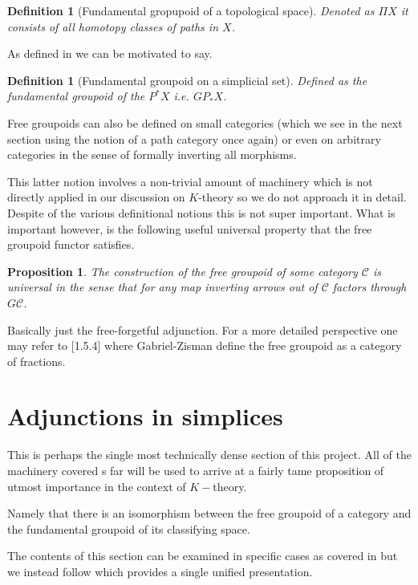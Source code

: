 \documentclass[12pt]{report}
\numberwithin{equation}{section}
\newtheorem{definition}[dummy]{Definition}
\newtheorem{proposition}[dummy]{Proposition}
\begin{document}
	\begin{definition}[Fundamental gropupoid of a topological space]
		Denoted as $\Pi X$ it consists of all homotopy classes of paths in $X$.
	\end{definition}
	
	As defined in \cite{gabriel1967calculus} we can be motivated to say.
	\begin{definition}[Fundamental groupoid on a simplicial set]
		Defined as the fundamental groupoid of the $P^*X$ i.e. \(GP_*X\).
	\end{definition}
	
	Free groupoids can also be defined on small categories (which we see in the next section using the notion of a path category once again) or even on arbitrary categories in the sense of formally inverting all morphisms. 
	
	This latter notion involves a non-trivial amount of machinery which is not directly applied in our discussion on \( K \)-theory so we do not approach it in detail. Despite of the various definitional notions this is not super important. What is important however, is the following useful universal property that the free groupoid functor satisfies. 
	\begin{proposition}\label{prop:universalfreegrpd}
		The construction of the free groupoid of some category \( \mathcal{C} \) is universal in the sense that for any map inverting arrows out of \( \mathcal{C} \) factors through \( G\mathcal{C} \).
	\end{proposition}
	
	Basically just the free-forgetful adjunction. For a more detailed perspective one may refer to \cite{gabriel1967calculus}[1.5.4] where Gabriel-Zisman define the free groupoid as a category of fractions.
	
	\section{Adjunctions in simplices}
	
	This is perhaps the single most technically dense section of this project. All of the machinery covered s far will be used to arrive at a fairly tame proposition of utmost importance in the context of \( K- \)theory. 
	
	Namely that there is an isomorphism between the free groupoid of a category and the fundamental groupoid of its classifying space.
	
	The contents of this section can be examined in specific cases as covered in \cite{Goerss_Jardine_2009} but we instead follow \cite{Riehl2011ALI} which provides a single unified presentation.
	
\end{document}
